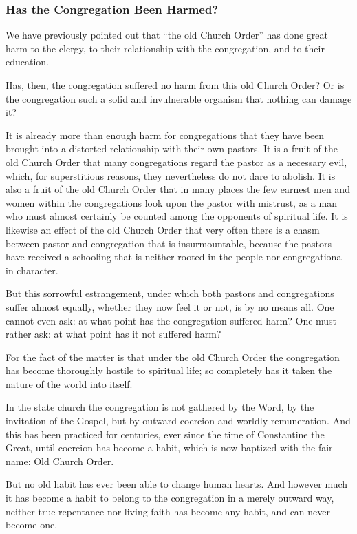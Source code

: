 \subsubsection{Has the Congregation Been Harmed?}

We have previously pointed out that “the old Church Order” has done great harm to the clergy, to their relationship with the congregation, and to their education.

Has, then, the congregation suffered no harm from this old Church Order? Or is the congregation such a solid and invulnerable organism that nothing can damage it?

It is already more than enough harm for congregations that they have been brought into a distorted relationship with their own pastors. It is a fruit of the old Church Order that many congregations regard the pastor as a necessary evil, which, for superstitious reasons, they nevertheless do not dare to abolish. It is also a fruit of the old Church Order that in many places the few earnest men and women within the congregations look upon the pastor with mistrust, as a man who must almost certainly be counted among the opponents of spiritual life. It is likewise an effect of the old Church Order that very often there is a chasm between pastor and congregation that is insurmountable, because the pastors have received a schooling that is neither rooted in the people nor congregational in character.

But this sorrowful estrangement, under which both pastors and congregations suffer almost equally, whether they now feel it or not, is by no means all. One cannot even ask: at what point has the congregation suffered harm? One must rather ask: at what point has it not suffered harm?

For the fact of the matter is that under the old Church Order the congregation has become thoroughly hostile to spiritual life; so completely has it taken the nature of the world into itself.

In the state church the congregation is not gathered by the Word, by the invitation of the Gospel, but by outward coercion and worldly remuneration. And this has been practiced for centuries, ever since the time of Constantine the Great, until coercion has become a habit, which is now baptized with the fair name: Old Church Order.

But no old habit has ever been able to change human hearts. And however much it has become a habit to belong to the congregation in a merely outward way, neither true repentance nor living faith has become any habit, and can never become one.

